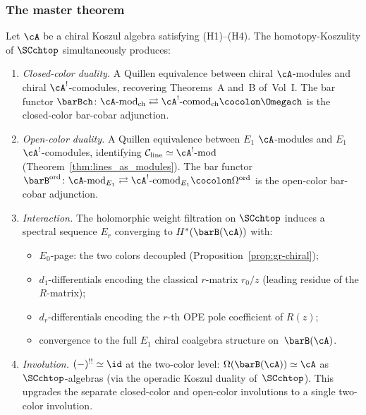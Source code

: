 \subsubsection*{The master theorem}

\begin{theorem}
Let $\cA$ be a chiral Koszul algebra satisfying
\textrm{(H1)--(H4)}. The homotopy-Koszulity of $\SCchtop$
simultaneously produces:
\begin{enumerate}[label=\textup{(\roman*)}]
\item \emph{Closed-color duality.}
 A Quillen equivalence between chiral $\cA$-modules and
 chiral $\cA^!$-comodules, recovering
 Theorems~A and~B of~Vol~I\@. The bar functor
 $\barBch \colon \cA\text{-mod}_{\mathrm{ch}} \rightleftarrows
 \cA^!\text{-comod}_{\mathrm{ch}} \cocolon \Omegach$ is
 the closed-color bar-cobar adjunction.
\item \emph{Open-color duality.}
 A Quillen equivalence between $E_1$ $\cA$-modules and $E_1$
 $\cA^!$-comodules, identifying
 $\mathcal{C}_{\mathrm{line}} \simeq \cA^!\text{-mod}$
 (Theorem~\ref{thm:lines_as_modules}). The bar functor
 $\barB^{\mathrm{ord}} \colon \cA\text{-mod}_{E_1}
 \rightleftarrows
 \cA^!\text{-comod}_{E_1} \cocolon \Omega^{\mathrm{ord}}$
 is the open-color bar-cobar adjunction.
\item \emph{Interaction.}
 The holomorphic weight filtration on $\SCchtop$ induces a
 spectral sequence $E_r$ converging to
 $H^\ast(\barB(\cA))$ with:
 \begin{itemize}
 \item $E_0$-page: the two colors decoupled
 (Proposition~\ref{prop:gr-chiral});
 \item $d_1$-differentials encoding the classical $r$-matrix
 $r_0/z$ (leading residue of the $R$-matrix);
 \item $d_r$-differentials encoding the $r$-th OPE pole
 coefficient of $R(z)$;
 \item convergence to the full $E_1$ chiral coalgebra structure
 on~$\barB(\cA)$.
 \end{itemize}
\item \emph{Involution.}
 $(-)^{!!} \simeq \id$ at the two-color level:
 $\Omega(\barB(\cA)) \simeq \cA$
 as $\SCchtop$-algebras (via the operadic Koszul duality
 of~$\SCchtop$). This upgrades the separate
 closed-color and open-color involutions to a single
 two-color involution.
\end{enumerate}
\end{theorem}

